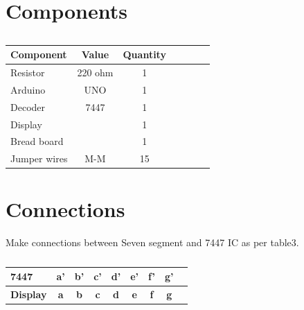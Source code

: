 \documentclass[10pt, a4paper]{article}
\title{\mytitle}
\author{\myauthor\hspace{1em}\\\contact\\IITH\hspace{0.5em}-\hspace{0.5em}\mymodule}
\date{}
\begin{document}
  \maketitle
\tableofcontents



\section{Components}



\begin{table}[htbp]
 \begin{center}
    \begin{tabular}{|l|c|c|c|c|c|c} \hline \textbf{Component}
  & \textbf{Value} & \textbf{Quantity} \\
 \hline
Resistor & 220 ohm & 1 \\ \hline
Arduino & UNO & 1 \\ \hline
Decoder & 7447 & 1 \\ \hline
Display &  & 1 \\ \hline
Bread board &  & 1 \\ \hline
Jumper wires & M-M & 15\\ \hline
\end{tabular}   
\end{center}
\caption{\label{table:dummytable} }
\end{table}

\section{Connections}



Make connections between Seven segment and 7447 IC as per  table3. 

\begin{table}[htbp]
 \begin{center}
    \begin{tabular}{|l|c|c|c|c|c|c|c|c} \hline \textbf{7447}
  & \textbf{a'} & \textbf{b'} & \textbf{c'}& \textbf{d'}& \textbf{e'}& \textbf{f'}& \textbf{g'} \\
 \hline
 \textbf{Display}
  & \textbf{a} & \textbf{b} & \textbf{c}& \textbf{d}& \textbf{e}& \textbf{f}& \textbf{g} \\\hline

\end{tabular}   
\end{center}
\caption{\label{table:dummytable} }
\end{table}
\end{document}
